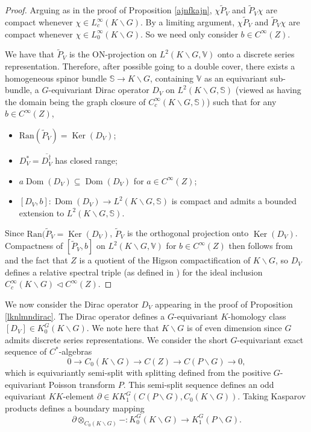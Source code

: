 \documentclass[a4paper,reqno]{amsart}
\numberwithin{equation}{section}
\def\Dom{\operatorname{Dom}}
\def\ker{\operatorname{Ker}}
\theoremstyle{definition}
\theoremstyle{remark}
\begin{document}
\begin{proof}
Arguing as in the proof of Proposition \ref{ajnfkajn}, $\chi \tilde{P}_V$ and $\tilde{P}_V\chi$ are compact whenever $\chi\in L^\infty_c(K\backslash G)$. By a limiting argument, $\chi \tilde{P}_V$ and $\tilde{P}_V\chi$ are compact whenever $\chi\in L^\infty_0(K\backslash G)$. So we need only consider $b\in  C^\infty(Z)$.


We have that $\tilde{P}_V$ is the ON-projection on $L^2(K\backslash G,\mathbb{V})$ onto a discrete series representation. Therefore, after possible going to a double cover, there exists \cite{atiischmid,laffaicm,partha} a homogeneous spinor bundle $\mathbb{S}\to K\backslash G$, containing $\mathbb{V}$ as an equivariant sub-bundle, a $G$-equivariant Dirac operator $D_V$ on $L^2(K\backslash G,\mathbb{S})$ (viewed as having the domain being the graph closure of $C^\infty_c(K\backslash G,\mathbb{S})$) such that for any $b\in C^\infty(Z)$,
\begin{itemize}
\item $\mathrm{Ran}(\tilde{P}_V)=\ker(D_V)$;
\item $D_V^*=\overline{D_V^\dagger}$ has closed range;
\item $a\Dom(D_V)\subseteq \Dom(D_V)$ for $a\in C^\infty(Z)$;
\item $[D_V,b]:\Dom(D_V)\to L^2(K\backslash G,\mathbb{S})$ is compact and admits a bounded extension to $L^2(K\backslash G,\mathbb{S})$. 
\end{itemize}


Since $\mathrm{Ran}(\tilde{P}_V=\ker(D_V)$, $\tilde{P}_V$ is the orthogonal projection onto $\ker(D_V)$. Compactness of $[\tilde{P}_V,b]$ on $L^2(K\backslash G,\mathbb{V})$ for $b\in C^\infty(Z)$ then follows from \cite[Subsection 3.4]{fries} and the fact that $Z$ is a quotient of the Higson compactification of $K\backslash G$, so $D_V$ defines a relative spectral triple (as defined in \cite[Definition 2.8]{fries}) for the ideal inclusion $C^\infty_c(K\backslash G)\lhd C^\infty(Z)$. 
\end{proof}

We now consider the Dirac operator $D_V$ appearing in the proof of Proposition \ref{lknlmndirac}. The Dirac operator defines a $G$-equivariant $K$-homology class $[D_V]\in K_0^G(K\backslash G)$. We note here that $K\backslash G$ is of even dimension since $G$ admits discrete series representations. We consider the short $G$-equivariant exact sequence of $C^*$-algebras
$$0\to C_0(K\backslash G)\to C(Z)\to C(P\backslash G)\to 0,$$
which is equivariantly semi-split with splitting defined from the positive $G$-equivariant Poisson transform $P$. This semi-split sequence defines an odd equivariant $KK$-element $\partial\in KK_1^G(C(P\backslash G),C_0(K\backslash G))$. Taking Kasparov products defines a boundary mapping 
$$\partial\otimes_{C_0(K\backslash G)}-:K_0^G(K\backslash G)\to K_1^G(P\backslash G).$$
\end{document}
